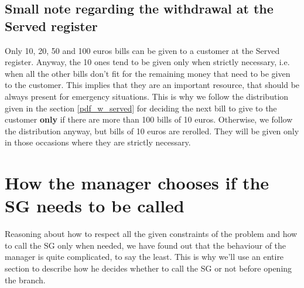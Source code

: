 \documentclass{article}
\begin{document}
\subsection{Small note regarding the withdrawal at the Served register}
Only 10, 20, 50 and 100 euros bills can be given to a customer at the Served register. Anyway, the 10 ones tend to be given only when strictly necessary, i.e. when all the other bills don't fit for the remaining money that need to be given to the customer. This implies that they are an important resource, that should be always present for emergency situations. This is why we follow the distribution given in the section \ref{pdf_w_served} for deciding the next bill to give to the customer \textbf{only} if there are more than 100 bills of 10 euros. Otherwise, we follow the distribution anyway, but bills of 10 euros are rerolled. They will be given only in those occasions where they are strictly necessary.

\section{How the manager chooses if the SG needs to be called}
Reasoning about how to respect all the given constraints of the problem and how to call the SG only when needed, we have found out that the behaviour of the manager is quite complicated, to say the least. This is why we'll use an entire section to describe how he decides whether to call the SG or not before opening the branch.
\end{document}
